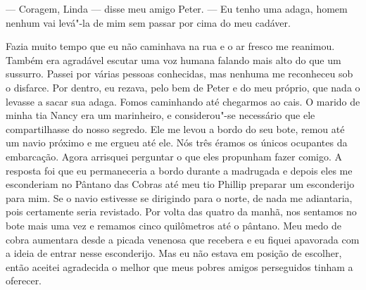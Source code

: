 --- Coragem, Linda --- disse meu amigo Peter. --- Eu tenho uma adaga,
homem nenhum vai levá"-la de mim sem passar por cima do meu cadáver.

Fazia muito tempo que eu não caminhava
na rua e o ar fresco me reanimou. Também era agradável escutar uma voz
humana falando mais alto do que um sussurro. Passei por várias pessoas
conhecidas, mas nenhuma me reconheceu sob o disfarce. Por dentro, eu
rezava, pelo bem de Peter e do meu próprio, que nada o levasse a sacar
sua adaga. Fomos caminhando até chegarmos ao cais. O marido de minha tia
Nancy era um marinheiro, e considerou"-se necessário que ele
compartilhasse do nosso segredo. Ele me levou a bordo do seu bote, remou
até um navio próximo e me ergueu até ele. Nós três éramos os únicos
ocupantes da embarcação. Agora arrisquei perguntar o que eles propunham
fazer comigo. A resposta foi que eu permaneceria a bordo durante a
madrugada e depois eles me esconderiam no Pântano das Cobras até meu tio
Phillip preparar um esconderijo para mim. Se o navio estivesse se
dirigindo para o norte, de nada me adiantaria, pois certamente seria
revistado. Por volta das quatro da manhã, nos sentamos no bote mais uma
vez e remamos cinco quilômetros até o pântano. Meu medo de cobra
aumentara desde a picada venenosa que recebera e eu fiquei apavorada com
a ideia de entrar nesse esconderijo. Mas eu não estava em posição de
escolher, então aceitei agradecida o melhor que meus pobres amigos
perseguidos tinham a oferecer.

